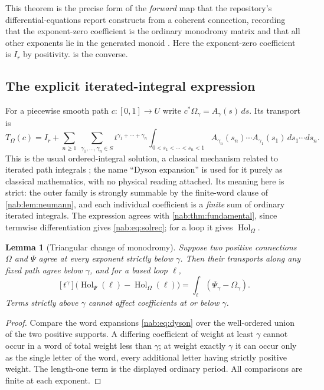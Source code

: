 \documentclass[11pt,letterpaper]{article}
\newtheorem{lemma}[lemma]{Lemma}
\theoremstyle{definition}
\theoremstyle{remark}
\newcommand{\Hol}{\operatorname{Hol}}
\newcommand{\coeff}[1]{[t^{#1}]}
\numberwithin{equation}{section}
\begin{document}
This theorem is the precise form of the \emph{forward} map that the
repository's differential-equations report constructs from a coherent
connection, recording that the exponent-zero coefficient is the ordinary
monodromy matrix and that all other exponents lie in the generated monoid
\cite{RepoDiff}. Here the exponent-zero coefficient is $I_r$ by positivity.
 is the converse.

\subsection{The explicit iterated-integral expression}

For a piecewise smooth path $c:[0,1]\to U$ write
$c^*\Omega_\gamma=A_\gamma(s)\,ds$. Its transport is
\begin{equation}\label{nab:eq:dyson}
 T_\Omega(c)=I_r+\sum_{n\geq1}\ \sum_{\gamma_1,\ldots,\gamma_n\in S}
 t^{\gamma_1+\cdots+\gamma_n}
 \int_{0<s_1<\cdots<s_n<1}
 A_{\gamma_n}(s_n)\cdots A_{\gamma_1}(s_1)\,ds_1\cdots ds_n.
\end{equation}
This is the usual ordered-integral solution, a classical mechanism related to
iterated path integrals \cite{Chen}; the name ``Dyson expansion'' is used for
it purely as classical mathematics, with no physical reading attached. Its
meaning here is strict: the outer family is strongly summable by the
finite-word clause of \cref{nab:lem:neumann}, and each individual coefficient
is a \emph{finite} sum of ordinary iterated integrals. The expression agrees
with \cref{nab:thm:fundamental}, since termwise differentiation gives
\eqref{nab:eq:solrec}; for a loop it gives $\Hol_\Omega$.

\begin{lemma}[Triangular change of monodromy]\label{nab:lem:triangular}
Suppose two positive connections $\Omega$ and $\Psi$ agree at every exponent
strictly below $\gamma$. Then their transports along any fixed path agree below
$\gamma$, and for a based loop $\ell$,
\begin{equation}\label{nab:eq:triangular}
 \coeff{\gamma}\bigl(\Hol_\Psi(\ell)-\Hol_\Omega(\ell)\bigr)
 =\int_\ell(\Psi_\gamma-\Omega_\gamma).
\end{equation}
Terms strictly above $\gamma$ cannot affect coefficients at or below $\gamma$.
\end{lemma}

\begin{proof}
Compare the word expansions \eqref{nab:eq:dyson} over the well-ordered union
of the two positive supports. A differing coefficient of weight at least
$\gamma$ cannot occur in a word of total weight less than $\gamma$; at weight
exactly $\gamma$ it can occur only as the single letter of the word, every
additional letter having strictly positive weight. The length-one term is the
displayed ordinary period. All comparisons are finite at each exponent.
\end{proof}
\end{document}
